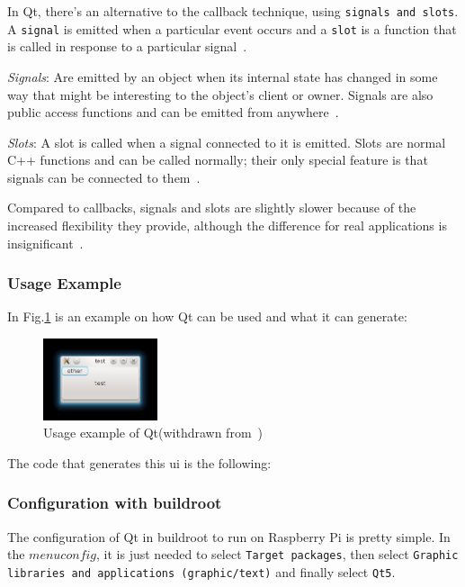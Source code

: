In Qt, there's an alternative to the callback technique, using \texttt{signals and slots}. A \texttt{signal} is emitted when a particular event occurs and a \texttt{slot} is a function that is called in response to a particular signal~\cite{qt-signals-slots}.

\begin{item-c}
\item\emph{Signals}: Are emitted by an object when its internal state has changed in some way that might be interesting to the object's client or owner. Signals are also public access functions and can be emitted from anywhere~\cite{qt-signals-slots}.
\item\emph{Slots}: A slot is called when a signal connected to it is emitted. Slots are normal C++ functions and can be called normally; their only special feature is that signals can be connected to them~\cite{qt-signals-slots}.
\end{item-c}

Compared to callbacks, signals and slots are slightly slower because of the increased flexibility they provide, although the difference for real applications is insignificant~\cite{qt-signals-slots}.

\subsubsection{Usage Example}

In Fig.\ref{fig:qt-usage-example} is an example on how Qt can be used and what it can generate:
%
\begin{figure}[!hbt]
\centering
    \includegraphics[width=0.3\textwidth]{./img/qt-usage-example.png}
  \caption{Usage example of Qt(withdrawn from~\cite{qt-usage})}%
\label{fig:qt-usage-example}
\end{figure}

The code that generates this \gls{ui} is the following:
%

%

\subsubsection{Configuration with buildroot}
The configuration of Qt in buildroot to run on Raspberry Pi is pretty simple. 
In the $menuconfig$, it is just needed to select \texttt{Target packages}, then select \texttt{Graphic libraries and applications (graphic/text)} and finally select \texttt{Qt5}.

